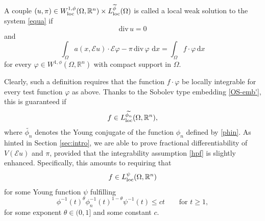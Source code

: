 \documentclass[leqno,11pt]{amsart}%
\numberwithin{equation}{section}
\newcommand{\dive}{\mathrm{div}\,}
\def\real{\mathbb R}
\def\Rn{{\mathbb R}^{n}}
\def\d{\mathrm{d}}
\def\E{\mathcal{E}}
\def\dx{\d x}
\theoremstyle{definition}
\numberwithin{equation}{section}
\begin{document}
 
A couple $(u,\pi)\in W^{1,\phi}_{\rm loc}(\Omega,\real^n)\times L^{\widetilde\phi}_{\rm loc}(\Omega)$ is called a local weak solution to
the system \eqref{equa} if $$\dive u=0$$  and
\begin{equation}\label{weak-equa}
  \int_{\Omega} a(x,\E
  u)\cdot\E\varphi-\pi\,\dive\varphi  \,\,\dx
  =
  \int_{\Omega}f\cdot\varphi\,\dx
\end{equation}
 for every  $\varphi\in  W^{1,\phi}(\Omega,\real^n)$ with compact support in $\Omega$.
 
  Clearly, such a definition requires that 
the function $f\cdot \varphi$ be locally integrable for every test function  $\varphi$ as above. Thanks to the Sobolev type embedding \eqref{OS-emb'}, this is guaranteed if 
\begin{align}\label{hpf}
    f\in L^{\widetilde {\phi_n}}_{\rm loc}(\Omega, \real^n),
\end{align}
where $\widetilde {\phi_n}$ denotes the Young conjugate of the function $\phi_n$ defined by \eqref{phin}. As hinted in Section \ref{sec:intro}, we are able to prove fractional differentiability of $V(\E u)$ and $\pi$, provided that the integrability assumption \eqref{hpf} is slightly enhanced. Specifically, this amounts to requiring that 
$$f\in L^\psi_{\rm loc}(\Omega, \Rn)$$
for some Young function $\psi$
fulfilling
    \begin{equation}\label{psi-assumption-main}
  \phi^{-1}(t)^{\theta} \phi_{n}^{-1}(t)^{1-\theta} \psi^{-1}(t)\le  c t
  \qquad\mbox{for}\,\, t\geq 1,
\end{equation}
for some exponent $\theta \in (0,1]$ and some constant $c$. 
\end{document}
